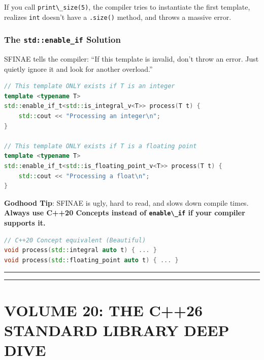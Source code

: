If you call \passthrough{\lstinline!print\_size(5)!}, the compiler tries
to instantiate the first template, realizes
\passthrough{\lstinline!int!} doesn't have a
\passthrough{\lstinline!.size()!} method, and throws a massive error.

\hypertarget{the-stdenable_if-solution}{%
\subsubsection{\texorpdfstring{The \texttt{std::enable\_if}
Solution}{The std::enable\_if Solution}}\label{the-stdenable_if-solution}}

SFINAE tells the compiler: ``If this template is invalid, don't throw an
error. Just quietly ignore it and look for another overload.''

\begin{lstlisting}[language={C++}]
// This template ONLY exists if T is an integer
template <typename T>
std::enable_if_t<std::is_integral_v<T>> process(T t) {
    std::cout << "Processing an integer\n";
}

// This template ONLY exists if T is a floating point
template <typename T>
std::enable_if_t<std::is_floating_point_v<T>> process(T t) {
    std::cout << "Processing a float\n";
}
\end{lstlisting}

\textbf{Godhood Tip}: SFINAE is ugly, hard to read, and slows down
compile times. \textbf{Always use C++20 Concepts instead of
\passthrough{\lstinline!enable\_if!} if your compiler supports it.}

\begin{lstlisting}[language={C++}]
// C++20 Concept equivalent (Beautiful)
void process(std::integral auto t) { ... }
void process(std::floating_point auto t) { ... }
\end{lstlisting}

\begin{center}\rule{0.5\linewidth}{0.5pt}\end{center}

\begin{center}\rule{0.5\linewidth}{0.5pt}\end{center}

\hypertarget{volume-20-the-c26-standard-library-deep-dive}{%
\section{VOLUME 20: THE C++26 STANDARD LIBRARY DEEP
DIVE}\label{volume-20-the-c26-standard-library-deep-dive}}

